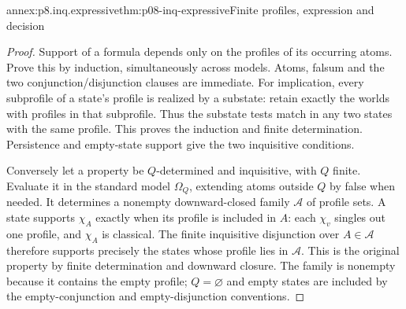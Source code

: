 \begin{annexitem}{annex:p8.inq.expressive}{thm:p08-inq-expressive}{Finite profiles, expression and decision}
\begin{proof}
Support of a formula depends only on the profiles of its occurring atoms.
Prove this by induction, simultaneously across models. Atoms, falsum and
the two conjunction/disjunction clauses are immediate. For implication,
every subprofile of a state's profile is realized by a substate: retain
exactly the worlds with profiles in that subprofile. Thus the substate
tests match in any two states with the same profile. This proves the
induction and finite determination. Persistence and empty-state support
give the two inquisitive conditions.

Conversely let a property be \(Q\)-determined and inquisitive, with \(Q\)
finite. Evaluate it in the standard model \(\Omega_Q\), extending atoms
outside \(Q\) by false when needed. It determines a nonempty downward-closed
family \(\mathcal A\) of profile sets. A state supports \(\chi_A\) exactly
when its profile is included in \(A\): each \(\chi_v\) singles out one
profile, and \(\chi_A\) is classical. The finite inquisitive disjunction
over \(A\in\mathcal A\) therefore supports precisely the states whose
profile lies in \(\mathcal A\). This is the original property by finite
determination and downward closure. The family is nonempty because it
contains the empty profile; \(Q=\varnothing\) and empty states are included
by the empty-conjunction and empty-disjunction conventions.


\end{proof}
\end{annexitem}
